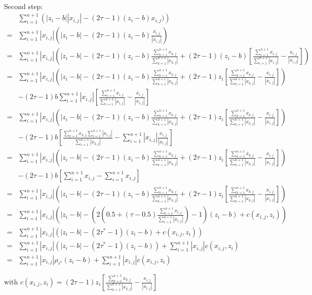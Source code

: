 \documentclass[11pt]{article}
\begin{document}
Second step:
\allowdisplaybreaks
\begin{align*}
  & \sum_{i=1}^{n+1}\left( |z_{i}-b| |x_{i,j}| - (2\tau-1)(z_{i}-b)x_{i,j}) \right)& \\
= & \sum_{i=1}^{n+1}|x_{i,j}|\left( |z_{i}-b| - (2\tau-1)(z_{i}-b)\frac{x_{i,j}}{|x_{i,j}|} \right)& \\
= & \sum_{i=1}^{n+1}|x_{i,j}|\left( |z_{i}-b| - (2\tau-1)(z_{i}-b)\frac{\sum_{k=1}^{n+1}x_{k,j}}{\sum_{k=1}^{n+1}|x_{k,j}|}
 + (2\tau-1)(z_{i}-b)\left[ \frac{\sum_{i=1}^{n+1}x_{i,j}}{\sum_{i=1}^{n+1}|x_{i,j}|} - \frac{x_{i,j}}{|x_{i,j}|} \right] \right)& \\
= & \sum_{i=1}^{n+1}|x_{i,j}|\left( |z_{i}-b| - (2\tau-1)(z_{i}-b)\frac{\sum_{k=1}^{n+1}x_{k,j}}{\sum_{k=1}^{n+1}|x_{k,j}|}+(2\tau-1)z_{i}\left[ \frac{\sum_{k=1}^{n+1}x_{k,j}}{\sum_{k=1}^{n+1}|x_{k,j}|} - \frac{x_{i,j}}{|x_{i,j}|} \right]\right) \\
& - (2\tau-1)b\sum_{i=1}^{n+1}|x_{i,j}|\left[ \frac{\sum_{i=1}^{n+1}x_{i,j}}{\sum_{i=1}^{n+1}|x_{i,j}|} - \frac{x_{i,j}}{|x_{i,j}|} \right] & \\
= & \sum_{i=1}^{n+1}|x_{i,j}|\left( |z_{i}-b| - (2\tau-1)(z_{i}-b)\frac{\sum_{k=1}^{n+1}x_{k,j}}{\sum_{k=1}^{n+1}|x_{k,j}|}+(2\tau-1)z_{i}\left[ \frac{\sum_{k=1}^{n+1}x_{k,j}}{\sum_{k=1}^{n+1}|x_{k,j}|} - \frac{x_{i,j}}{|x_{i,j}|} \right]\right) \\
& - (2\tau-1)b\left[\frac{\sum_{k=1}^{n+1}x_{k,j}\sum_{i=1}^{n+1}|x_{i,j}|}{\sum_{i=1}^{n+1}|x_{k,j}|} - \sum_{i=1}^{n+1}|x_{i,j}|\frac{x_{i,j}}{|x_{i,j}|} \right] & \\
= & \sum_{i=1}^{n+1}|x_{i,j}|\left( |z_{i}-b| - (2\tau-1)(z_{i}-b)\frac{\sum_{k=1}^{n+1}x_{k,j}}{\sum_{k=1}^{n+1}|x_{k,j}|}+(2\tau-1)z_{i}\left[ \frac{\sum_{k=1}^{n+1}x_{k,j}}{\sum_{k=1}^{n+1}|x_{k,j}|} - \frac{x_{i,j}}{|x_{i,j}|} \right]\right) \\
& - (2\tau-1)b\left[\sum_{i=1}^{n+1}x_{i,j} - \sum_{i=1}^{n+1}x_{i,j} \right] & \\
= & \sum_{i=1}^{n+1}|x_{i,j}|\left( |z_{i}-b| - (2\tau-1)(z_{i}-b)\frac{\sum_{k=1}^{n+1}x_{k,j}}{\sum_{k=1}^{n+1}|x_{k,j}|}+(2\tau-1)z_{i}\left[ \frac{\sum_{k=1}^{n+1}x_{k,j}}{\sum_{k=1}^{n+1}|x_{k,j}|} - \frac{x_{i,j}}{|x_{i,j}|} \right]\right) \\
= & \sum_{i=1}^{n+1}|x_{i,j}|\left( |z_{i}-b| - (2(0.5+(\tau-0.5)\frac{\sum_{i=1}^{n+1}x_{i,j}}{\sum_{i=1}^{n+1}|x_{i,j}|})-1)(z_{i}-b) + c(x_{i,j}, z_{i}) \right)&\\
= & \sum_{i=1}^{n+1}|x_{i,j}|\left( |z_{i}-b| - (2\tau^{*}-1)(z_{i}-b) + c(x_{i,j}, z_{i}) \right)&\\
= & \sum_{i=1}^{n+1}|x_{i,j}|\left(|z_{i}-b| - (2\tau^{*}-1)(z_{i}-b)\right) + \sum_{i=1}^{n+1}|x_{i,j}|c(x_{i,j}, z_{i})&\\
= & \sum_{i=1}^{n+1}|x_{i,j}|\rho_{\tau^{*}}(z_{i}-b) + \sum_{i=1}^{n+1}|x_{i,j}|c(x_{i,j}, z_{i})&
\end{align*}

with $c(x_{i,j}, z_{i})=(2\tau-1)z_{i}\left[ \frac{\sum_{k=1}^{n+1}x_{k,j}}{\sum_{k=1}^{n+1}|x_{k,j}|} - \frac{x_{i,j}}{|x_{i,j}|} \right]$
\end{document}
